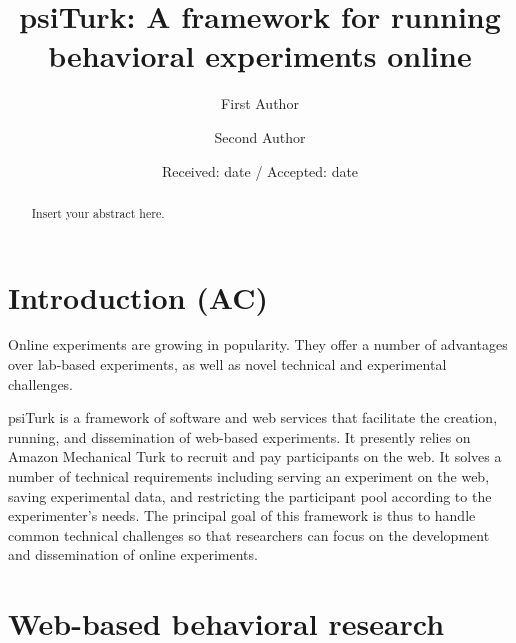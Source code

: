 \documentclass[twocolumn]{svjour3}          %
\begin{document}
\title{psiTurk: A framework for running behavioral experiments online}

\author{First Author         \and
        Second Author %
}




\date{Received: date / Accepted: date}

\maketitle

\begin{abstract}
Insert your abstract here.
\end{abstract}

\section{Introduction (AC)}

Online experiments are growing in popularity. 
They offer a number of advantages over lab-based experiments, as well as novel technical and experimental challenges.

psiTurk is a framework of software and web services that facilitate the creation, running, and dissemination of web-based experiments.
It presently relies on Amazon Mechanical Turk to recruit and pay participants on the web.
It solves a number of technical requirements including serving an experiment on the web, saving experimental data, and restricting the participant pool according to the experimenter's needs.
The principal goal of this framework is thus to handle common technical challenges so that researchers can focus on the development and dissemination of online experiments.

\section{Web-based behavioral research}
\end{document}
